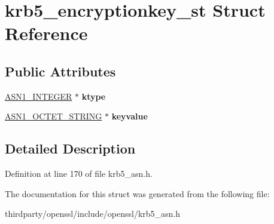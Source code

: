 \hypertarget{structkrb5__encryptionkey__st}{}\section{krb5\+\_\+encryptionkey\+\_\+st Struct Reference}
\label{structkrb5__encryptionkey__st}
\subsection*{Public Attributes}
\begin{DoxyCompactItemize}
\item 
\mbox{\label{structkrb5__encryptionkey__st_a883042268f43cbab262213ebbb7887a9}} 
\hyperlink{structasn1__string__st}{A\+S\+N1\+\_\+\+I\+N\+T\+E\+G\+ER} $\ast$ {\bfseries ktype}
\item 
\mbox{\label{structkrb5__encryptionkey__st_a6bed28f0b8e2345d51f976c57f0ec240}} 
\hyperlink{structasn1__string__st}{A\+S\+N1\+\_\+\+O\+C\+T\+E\+T\+\_\+\+S\+T\+R\+I\+NG} $\ast$ {\bfseries keyvalue}
\end{DoxyCompactItemize}


\subsection{Detailed Description}


Definition at line 170 of file krb5\+\_\+asn.\+h.



The documentation for this struct was generated from the following file\+:\begin{DoxyCompactItemize}
\item 
thirdparty/openssl/include/openssl/krb5\+\_\+asn.\+h\end{DoxyCompactItemize}
